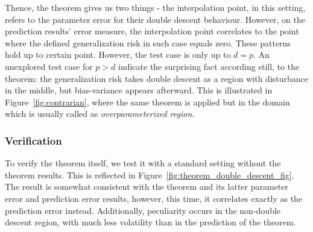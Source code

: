 \documentclass[10pt]{article}
\begin{document}
Thence, the theorem gives us two things - the interpolation point, in this setting, refers to the parameter error for their double descent behaviour. However, on the prediction results' error measure, the interpolation point correlates to the point where the defined generalization risk in such case equals zero. These patterns hold up to certain point. However, the test case is only up to $d=p$. An unexplored test case for $p>d$ indicate the surprising fact according still, to the theorem: the generalization risk takes double descent as a region with disturbance in the middle, but bias-variance appears afterward. This is illustrated in Figure~\ref{fig:contrarian}, where the same theorem is applied but in the domain which is usually called as \textit{overparameterized region}. 
\subsubsection{Verification}

To verify the theorem itself, we test it with a standard setting without the theorem results. This is reflected in Figure~\ref{fig:theorem_double_descent_fig}. The result is somewhat consistent with the theorem and its latter parameter error and prediction error results, however, this time, it correlates exactly as the prediction error instead. Additionally, peculiarity occurs in the non-double descent region, with much less volatility than in the prediction of the theorem. 
\end{document}
